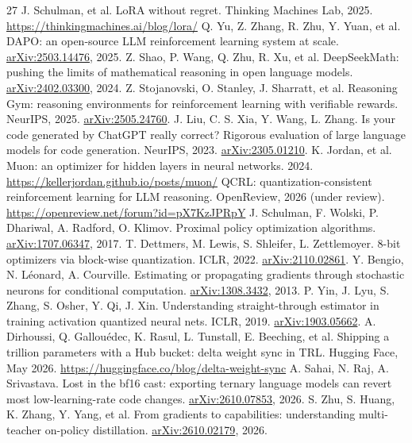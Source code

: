 \documentclass[
  10pt,
]{article}
\begin{document}
\begin{thebibliography}{27}
 J. Schulman, et al. LoRA without regret. Thinking Machines Lab, 2025. \url{https://thinkingmachines.ai/blog/lora/}
 Q. Yu, Z. Zhang, R. Zhu, Y. Yuan, et al. DAPO: an open-source LLM reinforcement learning system at scale. \href{https://arxiv.org/abs/2503.14476}{arXiv:2503.14476}, 2025.
 Z. Shao, P. Wang, Q. Zhu, R. Xu, et al. DeepSeekMath: pushing the limits of mathematical reasoning in open language models. \href{https://arxiv.org/abs/2402.03300}{arXiv:2402.03300}, 2024.
 Z. Stojanovski, O. Stanley, J. Sharratt, et al. Reasoning Gym: reasoning environments for reinforcement learning with verifiable rewards. NeurIPS, 2025. \href{https://arxiv.org/abs/2505.24760}{arXiv:2505.24760}.
 J. Liu, C. S. Xia, Y. Wang, L. Zhang. Is your code generated by ChatGPT really correct? Rigorous evaluation of large language models for code generation. NeurIPS, 2023. \href{https://arxiv.org/abs/2305.01210}{arXiv:2305.01210}.
 K. Jordan, et al. Muon: an optimizer for hidden layers in neural networks. 2024. \url{https://kellerjordan.github.io/posts/muon/}
 QCRL: quantization-consistent reinforcement learning for LLM reasoning. OpenReview, 2026 (under review). \url{https://openreview.net/forum?id=pX7KzJPRpY}
 J. Schulman, F. Wolski, P. Dhariwal, A. Radford, O. Klimov. Proximal policy optimization algorithms. \href{https://arxiv.org/abs/1707.06347}{arXiv:1707.06347}, 2017.
 T. Dettmers, M. Lewis, S. Shleifer, L. Zettlemoyer. 8-bit optimizers via block-wise quantization. ICLR, 2022. \href{https://arxiv.org/abs/2110.02861}{arXiv:2110.02861}.
 Y. Bengio, N. Léonard, A. Courville. Estimating or propagating gradients through stochastic neurons for conditional computation. \href{https://arxiv.org/abs/1308.3432}{arXiv:1308.3432}, 2013.
 P. Yin, J. Lyu, S. Zhang, S. Osher, Y. Qi, J. Xin. Understanding straight-through estimator in training activation quantized neural nets. ICLR, 2019. \href{https://arxiv.org/abs/1903.05662}{arXiv:1903.05662}.
 A. Dirhoussi, Q. Gallouédec, K. Rasul, L. Tunstall, E. Beeching, et al. Shipping a trillion parameters with a Hub bucket: delta weight sync in TRL. Hugging Face, May 2026. \url{https://huggingface.co/blog/delta-weight-sync}
 A. Sahai, N. Raj, A. Srivastava. Lost in the bf16 cast: exporting ternary language models can revert most low-learning-rate code changes. \href{https://arxiv.org/abs/2610.07853}{arXiv:2610.07853}, 2026.
 S. Zhu, S. Huang, K. Zhang, Y. Yang, et al. From gradients to capabilities: understanding multi-teacher on-policy distillation. \href{https://arxiv.org/abs/2610.02179}{arXiv:2610.02179}, 2026.
\end{thebibliography}
\endgroup
\end{document}

